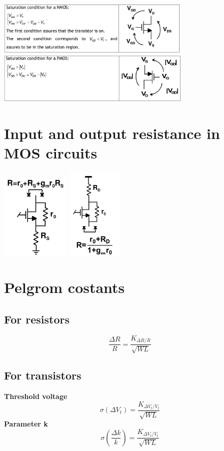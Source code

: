 \centering
\includegraphics[width=0.7\textwidth]{nmossat.png}\\
\includegraphics[width=0.7\textwidth]{pmossat.png}\\
\raggedright


\section{Input and output resistance in MOS circuits}

\centering
\includegraphics[width=0.25\textwidth]{dres.png}
\includegraphics[width=0.2\textwidth]{sres.png}\\
\raggedright

\section{Pelgrom costants}
\subsection{For resistors}
\begin{equation}
\frac{\Delta R}{R}=\frac{K_{\Delta R / R}}{\sqrt{WL}}
\end{equation}
\subsection{For transistors}
{\bf Threshold voltage}\\
\begin{equation}
\sigma(\Delta V_t)=\frac{K_{\Delta V_t / V_t}}{\sqrt{WL}}
\end{equation}
{\bf Parameter k}\\
\begin{equation}
\sigma(\frac{\Delta k}{k})=\frac{K_{\Delta V_t / V_t}}{\sqrt{WL}}
\end{equation}
